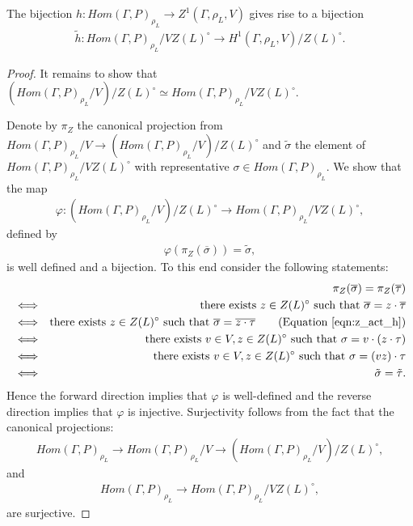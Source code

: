 \begin{lemma}
  The bijection $h: Hom(\Gamma, P)_{\rho_L} \rightarrow Z^1(\Gamma, \rho_L, V)$ gives rise to a bijection
  \begin{eqnarray*}
    \tilde{h}: Hom(\Gamma, P)_{\rho_L}/VZ(L)^\circ \rightarrow H^1(\Gamma, \rho_L, V)/Z(L)^\circ.
  \end{eqnarray*}
  \label{lem:vzl_h1zl}
\end{lemma}
\begin{proof}
  It remains to show that $\left(Hom(\Gamma, P)_{\rho_L}/V\right)/Z(L)^\circ \simeq Hom(\Gamma, P)_{\rho_L}/VZ(L)^\circ$.

  Denote by $\pi_Z$ the canonical projection from $Hom(\Gamma, P)_{\rho_L}/V \rightarrow \left( Hom(\Gamma, P)_{\rho_L}/V \right)/Z(L)^\circ$ and $\tilde{\sigma}$ the element of $Hom(\Gamma, P)_{\rho_L}/VZ(L)^\circ$ with representative $\sigma \in Hom(\Gamma, P)_{\rho_L}$. We show that the map
  \begin{eqnarray*}
    \varphi: (Hom(\Gamma, P)_{\rho_L}/V)/Z(L)^\circ \rightarrow Hom(\Gamma, P)_{\rho_L}/VZ(L)^\circ,
  \end{eqnarray*}
  defined by
  \begin{eqnarray*}
    \varphi(\pi_Z(\overline{\sigma})) = \tilde{\sigma},
  \end{eqnarray*}
  is well defined and a bijection. To this end consider the following statements:
  \begin{eqnarray*}
    && \pi_Z(\overline{\sigma}) = \pi_Z(\overline{\tau}) \\
    &\Longleftrightarrow& \textrm{there exists } z \in Z(L)^\circ \textrm{ such that } \overline{\sigma} = z \cdot \overline{\tau} \\
    &\Longleftrightarrow& \textrm{there exists } z \in Z(L)^\circ \textrm{ such that } \overline{\sigma} = \overline{z \cdot \tau} \qquad (\textrm{Equation } \ref{eqn:z_act_h}) \\
    &\Longleftrightarrow& \textrm{there exists } v \in V, z \in Z(L)^\circ \textrm{ such that } \sigma = v \cdot (z \cdot \tau) \\
    &\Longleftrightarrow& \textrm{there exists } v \in V, z \in Z(L)^\circ \textrm{ such that } \sigma = (vz) \cdot \tau \\
    &\Longleftrightarrow& \tilde{\sigma} = \tilde{\tau}.
  \end{eqnarray*}
  Hence the forward direction implies that $\varphi$ is well-defined and the reverse direction implies that $\varphi$ is injective. Surjectivity follows from the fact that the canonical projections:
  \begin{eqnarray*}
    Hom(\Gamma, P)_{\rho_L} \rightarrow Hom(\Gamma, P)_{\rho_L}/V \rightarrow (Hom(\Gamma, P)_{\rho_L}/V)/Z(L)^\circ, 
  \end{eqnarray*}
  and
  \begin{eqnarray*}
    Hom(\Gamma, P)_{\rho_L} \rightarrow Hom(\Gamma, P)_{\rho_L}/VZ(L)^\circ, 
  \end{eqnarray*}
  are surjective.
\end{proof}

